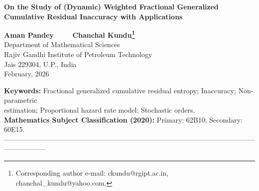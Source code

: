 \documentclass[12pt,a4paper]{article}
\numberwithin{equation}{section}
\begin{document}
	
	\begin{center}
		{\Large\bf On the Study of (Dynamic) Weighted Fractional Generalized Cumulative Residual Inaccuracy  with Applications} \\
		\vspace{0.3in}
		
		{\bf Aman Pandey~~~~ \bf Chanchal Kundu\footnote{Corresponding author e-mail: ckundu@rgipt.ac.in, chanchal\_kundu@yahoo.com.}}
		\\
		Department of Mathematical Sciences\\ Rajiv Gandhi Institute of Petroleum Technology\\Jais  229304, U.P., India\vspace{0.1in} \\{February, 2026}\\
	\end{center}
	\begin{abstract}
Recently, there has been growing interest in developing information-theoretic measures that capture uncertainty and inaccuracy. In this work, we introduce a novel measure, referred to as the weighted fractional generalized cumulative residual inaccuracy (WFGCRI), as an extension of the weighted cumulative residual inaccuracy (WCRI) to capture complex tail behavior and structural discrepancies between the true and assumed distributions. We derive its fundamental analytical properties and establish several bounds that highlight its key relationships. Further, we consider a dynamic version of WFGCRI, and its temporal evolution is examined under the proportional hazard rate and proportional odds models. An empirical estimation procedure for WFGCRI is developed, and its finite-sample performance is systematically assessed through Monte Carlo simulation studies. Moreover, the ability of WFGCRI to detect chaotic dynamics is demonstrated using the Ricker and Tent maps. The practical relevance of WFGCRI is further established through an analysis of a real dataset for uncertainty assessment. Additionally, we demonstrate that WFGCRI is superior to the traditional WCRI when applied to stock market data. 
	\end{abstract}
	\vskip 2mm
	
	\noindent \textbf{Keywords:} Fractional generalized cumulative residual entropy; Inaccuracy;  Non-parametric\\ estimation; Proportional hazard rate model;  Stochastic orders.\\
	\noindent \textbf{Mathematics Subject Classification (2020):} Primary: 62B10; Secondary: 60E15. \\
	\noindent------------------------------------------------------------------------------------------------------------------------------
	\pagestyle{myheadings}
	
\end{document}
